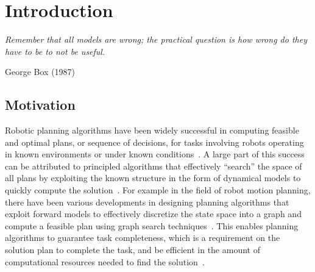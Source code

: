 
\chapter{Introduction}
\label{cha:introduction}

\epigraph{\textit{Remember that all models are wrong; the practical
    question is how wrong do they have to be to not be
    useful.}}{George Box (1987)}

\section{Motivation}
\label{sec:motivation}

Robotic planning algorithms have been widely successful in computing
feasible and optimal plans, or sequence of decisions, for tasks
involving robots operating in known environments or under known
conditions~\cite{DBLP:books/cu/L2006}. A large part of this success
can be attributed to principled algorithms that effectively
``search'' the space of all plans by exploiting the known
structure in the form of dynamical models to quickly compute the
solution~\cite{choset2005principles}. For example in the field of robot motion planning, there
have been various developments in designing planning algorithms that
exploit forward models to effectively discretize the state space into
a graph and compute a feasible plan using graph search
techniques~\cite{DBLP:books/daglib/0068760}. This enables planning
algorithms to guarantee task 
completeness, which is a requirement on the solution plan to complete
the task, and be efficient in the amount of computational resources
needed to find the solution~\cite{DBLP:journals/arobots/Hauser12}.

